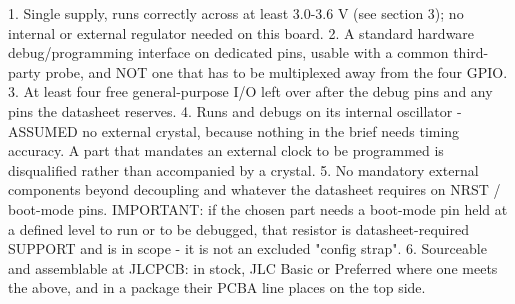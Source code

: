 \documentclass[11pt,a4paper]{article}
\begin{document}
1. Single supply, runs correctly across at least 3.0-3.6 V (see section 3); no internal or external regulator needed on this board. 2. A standard hardware debug/programming interface on dedicated pins, usable with a common third-party probe, and NOT one that has to be multiplexed away from the four GPIO. 3. At least four free general-purpose I/O left over after the debug pins and any pins the datasheet reserves. 4. Runs and debugs on its internal oscillator - ASSUMED no external crystal, because nothing in the brief needs timing accuracy. A part that mandates an external clock to be programmed is disqualified rather than accompanied by a crystal. 5. No mandatory external components beyond decoupling and whatever the datasheet requires on NRST / boot-mode pins. IMPORTANT: if the chosen part needs a boot-mode pin held at a defined level to run or to be debugged, that resistor is datasheet-required SUPPORT and is in scope - it is not an excluded "config strap". 6. Sourceable and assemblable at JLCPCB: in stock, JLC Basic or Preferred where one meets the above, and in a package their PCBA line places on the top side.
\end{document}
